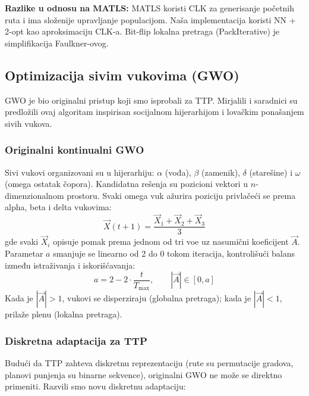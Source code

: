 \documentclass[12pt,a4paper]{article}
\begin{document}
\textbf{Razlike u odnosu na MATLS:} MATLS koristi CLK za generisanje po\v{c}etnih ruta i ima slo\v{z}enije upravljanje populacijom. Na\v{s}a implementacija koristi NN + 2-opt kao aproksimaciju CLK-a. Bit-flip lokalna pretraga (PackIterative) je simplifikacija Faulkner-ovog.

\subsection{Optimizacija sivim vukovima (GWO)}

GWO je bio originalni pristup koji smo isprobali za TTP. Mirjalili i saradnici \cite{mirjalili2014} su predlo\v{z}ili ovaj algoritam inspirisan socijalnom hijerarhijom i lova\v{c}kim pona\v{s}anjem sivih vukova.

\subsubsection{Originalni kontinualni GWO}

Sivi vukovi organizovani su u hijerarhiju: $\alpha$ (vođa), $\beta$ (zamenik), $\delta$ (starešine) i $\omega$ (omega ostatak \v{c}opora). Kandidatna re\v{s}enja su pozicioni vektori u $n$-dimenzionalnom prostoru. Svaki omega vuk a\v{z}urira poziciju privla\v{c}e\'{c}i se prema alpha, beta i delta vukovima:
\begin{equation}
    \vec{X}(t+1) = \frac{\vec{X}_1 + \vec{X}_2 + \vec{X}_3}{3}
\end{equation}
gde svaki $\vec{X}_i$ opisuje pomak prema jednom od tri vo\dj{}e uz nasumi\v{c}ni koeficijent $\vec{A}$. Parametar $a$ smanjuje se linearno od 2 do 0 tokom iteracija, kontrolišu\'{c}i balans između istra\v{z}ivanja i iskori\v{s}\'{c}avanja:
\begin{equation}
    a = 2 - 2 \cdot \frac{t}{T_{\max}}, \qquad
    |\vec{A}| \in [0, a]
\end{equation}
Kada je $|\vec{A}| > 1$, vukovi se disperziraju (globalna pretraga); kada je $|\vec{A}| < 1$, prila\v{z}e plenu (lokalna pretraga).

\subsubsection{Diskretna adaptacija za TTP}

Budu\'{c}i da TTP zahteva diskretnu reprezentaciju (rute su permutacije gradova, planovi punjenja su binarne sekvence), originalni GWO ne mo\v{z}e se direktno primeniti. Razvili smo novu diskretnu adaptaciju:
\end{document}
